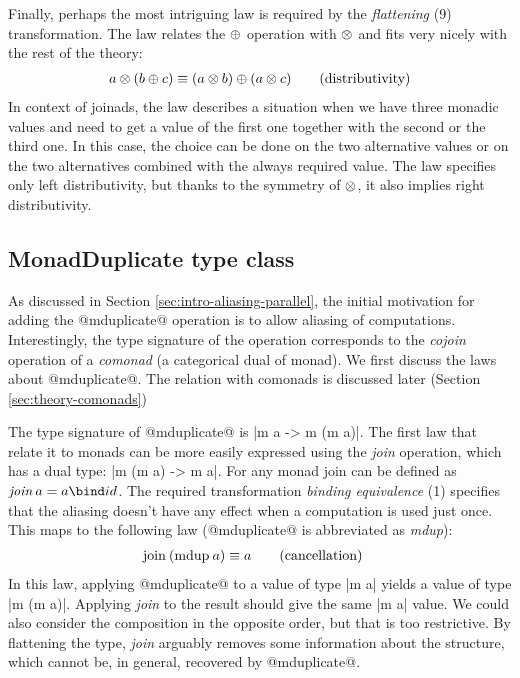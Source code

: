 \documentclass[preprint]{sigplanconf}
\begin{document}
Finally, perhaps the most intriguing law is required by the \textit{flattening} (9) transformation.
The law relates the $\oplus$ operation with $\otimes$ and fits very nicely with the rest of the 
theory: 
\begin{align*}
  a \otimes (b \oplus c) \equiv (a \otimes b) \oplus (a \otimes c) \tag{distributivity}
\end{align*}
In context of joinads, the law describes a situation when we have three monadic values and need to
get a value of the first one together with the second or the third one. In this case, the choice
can be done on the two alternative values or on the two alternatives combined with the always 
required value.
The law specifies only left distributivity, but thanks to the symmetry of $\otimes$, 
it also implies right distributivity.


\subsection{MonadDuplicate type class}
As discussed in Section \ref{sec:intro-aliasing-parallel}, the initial motivation for adding the 
@mduplicate@ operation is to allow aliasing of computations. Interestingly, the type signature
of the operation corresponds to the \textit{cojoin} operation of a \textit{comonad} (a categorical
dual of monad). We first discuss the laws about @mduplicate@. The relation with comonads is 
discussed later (Section \ref{sec:theory-comonads})

The type signature of @mduplicate@ is |m a -> m (m a)|. The first law that relate it to 
monads can be more easily expressed using the \textit{join} operation, which has a dual type: 
|m (m a) -> m a|. For any monad join can be defined as $\textit{join} \: a = a \bind id$. 
The required transformation \textit{binding equivalence} (1) specifies that the aliasing doesn't 
have any effect when a computation is used just once. This maps to the following law (@mduplicate@
is abbreviated as \textit{mdup}):
\begin{align*}
\text{join} \: (\text{mdup} \: a) &\equiv a \tag{cancellation}
\end{align*}
In this law, applying @mduplicate@ to a value of type |m a| yields a value of type |m (m a)|. 
Applying \textit{join} to the result should give the same |m a| value. We could also consider the 
composition in the opposite order, but that is too restrictive. By flattening the type, 
\textit{join} arguably removes some information about the structure, which cannot be, in general,
recovered by @mduplicate@.
\end{document}
